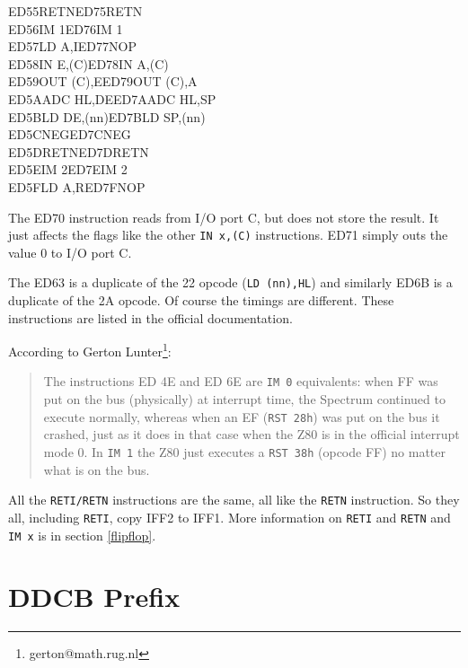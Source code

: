 \documentclass[oneside,a4paper]{book}
\begin{document}
{\begin{tabbing}
{\qquad}ED55\>RETN{\footnotemark[7]}\>ED75\>RETN{\footnotemark[7]}\\
{\qquad}ED56\>IM 1\>ED76\>IM 1{\footnotemark[7]}\\
{\qquad}ED57\>LD A,I\>ED77\>NOP{\footnotemark[7]}\\
{\qquad}ED58\>IN E,(C)\>ED78\>IN A,(C)\\
{\qquad}ED59\>OUT (C),E\>ED79\>OUT (C),A\\
{\qquad}ED5A\>ADC HL,DE\>ED7A\>ADC HL,SP\\
{\qquad}ED5B\>LD DE,(nn)\>ED7B\>LD SP,(nn)\\
{\qquad}ED5C\>NEG{\footnotemark[7]}\>ED7C\>NEG{\footnotemark[7]}\\
{\qquad}ED5D\>RETN{\footnotemark[7]}\>ED7D\>RETN{\footnotemark[7]}\\
{\qquad}ED5E\>IM 2\>ED7E\>IM 2{\footnotemark[7]}\\
{\qquad}ED5F\>LD A,R\>ED7F\>NOP{\footnotemark[7]}\\
\end{tabbing}
}
\renewcommand{\thefootnote}{\arabic{footnote}}

The ED70 instruction reads from I/O port C, but does not store the result. 
It just affects the flags like the other {\tt IN x,(C)} instructions. 
ED71 simply outs the value 0 to I/O port C.

The ED63 is a duplicate of the 22 opcode ({\tt LD (nn),HL}) and similarly
ED6B is a duplicate of the 2A opcode. Of course the timings are
different. These instructions are listed in the official documentation.

According to Gerton Lunter\footnote{gerton@math.rug.nl}:

\begin{quote}
  The instructions ED 4E and ED 6E are {\tt IM 0} equivalents: when FF was put
  on the bus (physically) at interrupt time, the Spectrum continued to
  execute normally, whereas when an EF ({\tt RST 28h}) was put on the bus it
  crashed, just as it does in that case when the Z80 is in the official
  interrupt mode 0.  In {\tt IM 1} the Z80 just executes a {\tt RST 38h} 
  (opcode FF) no matter what is on the bus.
\end{quote}

All the {\tt RETI/RETN} instructions are the same, all like the {\tt RETN}
instruction. So they all, including {\tt RETI}, copy IFF2 to IFF1. More 
information on {\tt RETI} and {\tt RETN} and {\tt IM x} is in 
section \ref{flipflop}.


\section{DDCB Prefix}
\label{prefix_cbdd}
\end{document}
